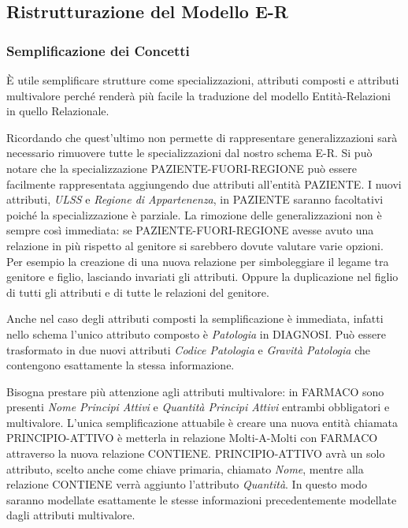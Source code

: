 \documentclass{article}
\begin{document}

\subsection{Ristrutturazione del Modello E-R}
\subsubsection{Semplificazione dei Concetti}

È utile semplificare strutture come specializzazioni, attributi composti e attributi multivalore perché renderà più facile la traduzione del modello Entità-Relazioni in quello Relazionale.

Ricordando che quest'ultimo non permette di rappresentare generalizzazioni sarà necessario rimuovere tutte le specializzazioni dal nostro schema E-R.
Si può notare che la specializzazione PAZIENTE-FUORI-REGIONE può essere facilmente rappresentata aggiungendo due attributi all'entità PAZIENTE.
I nuovi attributi, \textit{ULSS} e \textit{Regione di Appartenenza}, in PAZIENTE saranno facoltativi poiché la specializzazione è parziale.
La rimozione delle generalizzazioni non è sempre così immediata: se PAZIENTE-FUORI-REGIONE avesse avuto una relazione in più rispetto al genitore si sarebbero dovute valutare varie opzioni.
Per esempio la creazione di una nuova relazione per simboleggiare il legame tra genitore e figlio, lasciando invariati gli attributi.
Oppure la duplicazione nel figlio di tutti gli attributi e di tutte le relazioni del genitore.

Anche nel caso degli attributi composti la semplificazione è immediata, infatti nello schema l'unico attributo composto è \textit{Patologia} in DIAGNOSI.
Può essere trasformato in due nuovi attributi \textit{Codice Patologia} e \textit{Gravità Patologia} che contengono esattamente la stessa informazione.

Bisogna prestare più attenzione agli attributi multivalore:
in FARMACO sono presenti \textit{Nome Principi Attivi} e \textit{Quantità Principi Attivi} entrambi obbligatori e multivalore.
L'unica semplificazione attuabile è creare una nuova entità chiamata PRINCIPIO-ATTIVO è metterla in relazione Molti-A-Molti con FARMACO attraverso la nuova relazione CONTIENE.
PRINCIPIO-ATTIVO avrà un solo attributo, scelto anche come chiave primaria, chiamato \textit{Nome}, mentre alla relazione CONTIENE verrà aggiunto l'attributo \textit{Quantità}.
In questo modo saranno modellate esattamente le stesse informazioni precedentemente modellate dagli attributi multivalore.
\end{document}
